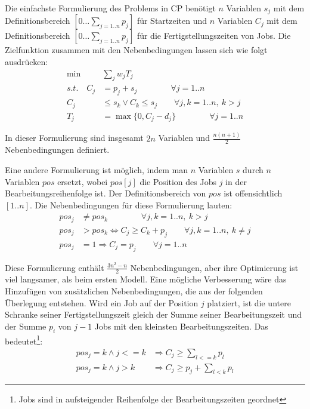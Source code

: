 Die einfachste Formulierung des Problems in CP benötigt $n$ Variablen $s_j$ mit dem Definitionsbereich $[0\dots \sum_{j=1..n}p_j]$ für Startzeiten und $n$ Variablen $C_j$ mit dem Definitionsbereich $[0\dots \sum_{j=1..n}p_j]$ für die Fertigstellungszeiten von Jobs. Die Zielfunktion zusammen mit den Nebenbedingungen lassen sich wie folgt ausdrücken:
\begin{align}
 \min & \sum_{j}{w_jT_j} \nonumber \\
 s.t.\quad C_j & = p_j + s_j\qquad\qquad \forall j=1..n \nonumber \\
 C_j  & \le s_k \vee  C_k \le s_j \qquad \forall j,k=1..n,\ k>j \nonumber \\
 T_j & = \max\{0, C_j - d_j\} \qquad\qquad \forall j=1..n \nonumber
\end{align}

In dieser Formulierung sind insgesamt $2n$ Variablen und $\frac{n(n+1)}{2}$ Nebenbedingungen definiert.

Eine andere Formulierung ist möglich, indem man $n$ Variablen $s$ durch $n$ Variablen $pos$ ersetzt, wobei $pos[j]$ die Position des Jobs $j$ in der Bearbeitungsreihenfolge ist. Der Definitionsbereich von $pos$ ist offensichtlich $[1..n]$. Die Nebenbedingungen für diese Formulierung lauten:
\begin{align}
 pos_j & \not= pos_k\qquad\qquad \forall j,k=1..n,\ k>j \nonumber \\
 pos_j  & > pos_k \Leftrightarrow  C_j \ge C_k + p_j \qquad \forall j,k=1..n,\ k\not=j \nonumber \\
 pos_j  & = 1 \Rightarrow C_j=p_j \qquad \forall j=1..n \nonumber
\end{align}

Diese Formulierung enthält  $\frac{3n^2-n}{2}$ Nebenbedingungen, aber ihre Optimierung ist viel langsamer, als beim ersten Modell. Eine mögliche Verbesserung wäre das Hinzufügen von zusätzlichen Nebenbedingungen, die aus der folgenden Überlegung entstehen. Wird ein Job auf der Position $j$ platziert, ist die untere Schranke seiner Fertigstellungszeit gleich der Summe seiner Bearbeitungszeit und der Summe $p_i$ von $j-1$ Jobs mit den kleinsten Bearbeitungszeiten. Das bedeutet\footnote{Jobs sind in aufsteigender Reihenfolge der Bearbeitungszeiten geordnet}:
\begin{align}
  pos_j=k \wedge j<=k  & \Rightarrow C_j \ge \sum_{l<=k} p_l \nonumber \\
  pos_j=k \wedge j>k  & \Rightarrow C_j \ge p_j+\sum_{l<k} p_l \nonumber 
\end{align}

